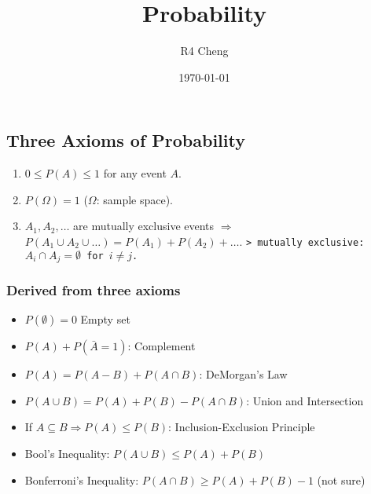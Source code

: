 \documentclass[12pt,a4paper]{article}
\title{Probability}
\author{R4 Cheng}
\date{\today}
\begin{document}
\maketitle

\subsection*{Three Axioms of Probability}

\begin{enumerate}
    \item $0 \leq P(A) \leq 1$ for any event $A$.
    \item $P(\Omega) = 1$ ($\Omega$: sample space).
    \item $A_1, A_2, \dots$ are mutually exclusive events $\Rightarrow$ $P(A_1 \cup A_2 \cup \dots) = P(A_1) + P(A_2) + \dots$.
    \texttt{> mutually exclusive: $A_i \cap A_j = \emptyset$ for $i \neq j$.}
\end{enumerate}

\subsubsection*{Derived from three axioms}

\begin{itemize}
    \item $P(\emptyset) = 0$ Empty set
    \item $P(A) + P(\bar{A} = 1)$: Complement
    \item $P(A) = P(A - B) + P(A \cap B)$: DeMorgan's Law
    \item $P(A \cup B) = P(A) + P(B) - P(A \cap B)$: Union and Intersection
    \item If $A \subseteq B \Rightarrow P(A) \leq P(B)$: Inclusion-Exclusion Principle
    \item Bool's Inequality: $P(A \cup B) \leq P(A) + P(B)$
    \item Bonferroni's Inequality: $P(A \cap B) \geq P(A) + P(B) - 1$ (not sure)
\end{itemize}
\end{document}
